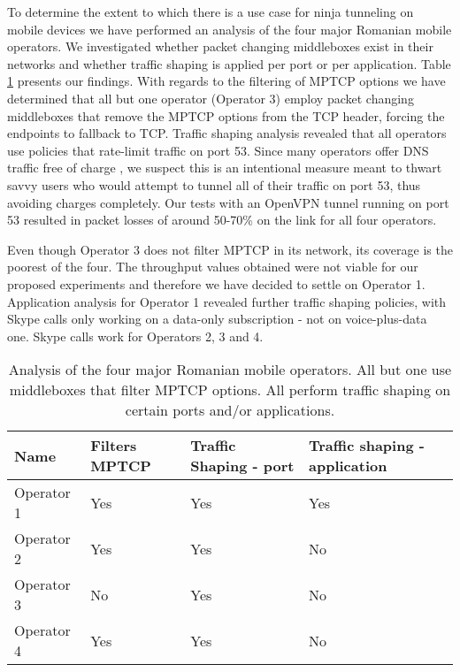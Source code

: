 
To determine the extent to which there is a use case for ninja tunneling on
mobile devices we have performed an analysis of the four major Romanian mobile
operators. We investigated whether packet changing middleboxes exist in their
networks and whether traffic shaping is applied per port or per application.
Table \ref{table:operators} presents our findings. With regards to the
filtering of MPTCP options we have determined that all but one operator
(Operator 3) employ packet changing middleboxes that remove the MPTCP options
from the TCP header, forcing the endpoints to fallback to TCP. Traffic shaping
analysis revealed that all operators use policies that rate-limit traffic on
port 53. Since many operators offer DNS traffic free of charge \cite{freedns},
we suspect this is an intentional measure meant to thwart savvy users who
would attempt to tunnel all of their traffic on port 53, thus avoiding charges
completely. Our tests with an OpenVPN tunnel running on port 53 resulted in
packet losses of around 50-70\% on the link for all four operators.

Even though Operator 3 does not filter MPTCP in its network, its coverage is the poorest of the four. The throughput values obtained were not viable for our proposed experiments and therefore we have decided to settle on Operator 1. Application analysis for Operator 1 revealed further traffic shaping policies, with Skype calls only working on a data-only subscription - not on voice-plus-data one. Skype calls work for Operators 2, 3 and 4.

\begin{center}
    \begin{table}
    \centering
    \begin{tabular}{ | l | l | l | l | }
    \hline
    Name & Filters MPTCP & Traffic Shaping - port & Traffic shaping - application \\ \hline
    Operator 1 & Yes & Yes & Yes  \\ \hline
    Operator 2 & Yes & Yes & No \\ \hline
    Operator 3 & No & Yes & No \\ \hline
    Operator 4 & Yes & Yes & No \\ \hline
    \end{tabular}
    \caption{Analysis of the four major Romanian mobile operators. All but one use middleboxes that filter MPTCP options. All perform traffic shaping on certain ports and/or applications. }
    \label{table:operators}
    \end{table}
\end{center}

